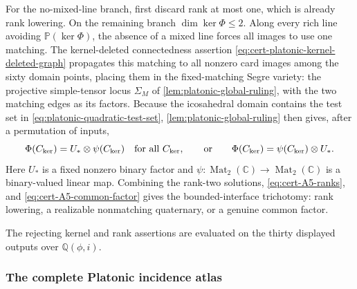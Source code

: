 \documentclass[11pt,letterpaper,onecolumn]{article}
\theoremstyle{plain}
\theoremstyle{definition}
\theoremstyle{remark}
\newcommand{\Mat}{\operatorname{Mat}}
\begin{document}
For the no-mixed-line branch, first discard rank at most one, which is
already rank lowering.  On the remaining branch
\(\dim\ker\Phi\le2\).  Along every rich line avoiding
\(\mathbb P(\ker\Phi)\), the absence of a mixed line forces all images to
use one matching.  The kernel-deleted connectedness assertion
\cref{eq:cert-platonic-kernel-deleted-graph} propagates this matching to all
nonzero card images among the sixty domain points, placing them in the
fixed-matching Segre variety: the projective simple-tensor locus
\(\Sigma_M\) of \cref{lem:platonic-global-ruling}, with the two matching
edges as its factors.
Because the icosahedral
domain contains the test set in \cref{eq:platonic-quadratic-test-set},
\cref{lem:platonic-global-ruling} then gives, after a permutation of inputs,
\begin{equation}
 \Phi(C_{\rm ker})=U_*\otimes\psi(C_{\rm ker})
 \quad\text{for all }C_{\rm ker},
 \qquad\text{or}\qquad
 \Phi(C_{\rm ker})=\psi(C_{\rm ker})\otimes U_*.
 \label{eq:cert-A5-common-factor}
\end{equation}
Here \(U_*\) is a fixed nonzero binary factor and
\(\psi:\Mat_2(\mathbb C)\to\Mat_2(\mathbb C)\) is a binary-valued linear
map.
Combining the rank-two solutions, \eqref{eq:cert-A5-ranks}, and
\eqref{eq:cert-A5-common-factor} gives the bounded-interface trichotomy:
rank lowering, a realizable nonmatching quaternary, or a genuine common
factor.

The rejecting kernel and rank assertions are evaluated on the thirty
displayed outputs over \(\mathbb Q(\phi,i)\).

\subsubsection{The complete Platonic incidence atlas}
\label{proofsubsec:cert-platonic-incidence-atlas}
\end{document}
